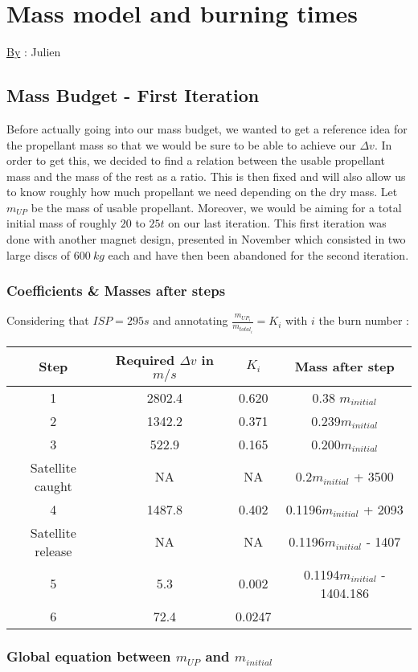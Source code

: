 \chapter{Mass model and burning times}
\qquad \underline{By} : Julien
\section{Mass Budget - First Iteration}

\qquad Before actually going into our mass budget, we wanted to get a reference
idea for the propellant mass so that we would be sure to be able to
achieve our \(\Delta v\). In order to get this, we decided to find a
relation between the usable propellant mass and the mass of the rest as
a ratio. This is then fixed and will also allow us to know roughly how
much propellant we need depending on the dry mass. Let \(m_{UP}\) be the
mass of usable propellant. Moreover, we would be aiming for a total initial mass of roughly $20$ to $25t$ on our last iteration. This first iteration was done with another magnet design, presented in November which consisted in two large discs of $600\ kg$ each and have then been abandoned for the second iteration.


\subsection{Coefficients \& Masses after steps}

Considering that \(ISP = 295s\) and annotating
\(\frac{m_{UP_i}}{m_{total_i}} = K_i\) with \(i\) the burn number :

\begin{longtable}[]{@{}cccc@{}}
\toprule
Step & Required \(\Delta v\) in \(m/s\) & \(K_i\) & Mass after
step\tabularnewline
\midrule
\endhead
1 & 2802.4 & 0.620 & 0.38 \(m_{initial}\)\tabularnewline
2 & 1342.2 & 0.371 & 0.239\(m_{initial}\)\tabularnewline
3 & 522.9 & 0.165 & 0.200\(m_{initial}\)\tabularnewline
Satellite caught & NA & NA & 0.2\(m_{initial}\) + 3500\tabularnewline
4 & 1487.8 & 0.402 & 0.1196\(m_{initial}\) + 2093\tabularnewline
Satellite release & NA & NA & 0.1196\(m_{initial}\) -
1407\tabularnewline
5 & 5.3 & 0.002 & 0.1194\(m_{initial}\) - 1404.186\tabularnewline
6 & 72.4 & 0.0247 &\tabularnewline
\bottomrule
\end{longtable}


\subsection{Global equation between $m_{UP}$ and
	$m_{initial}$}

